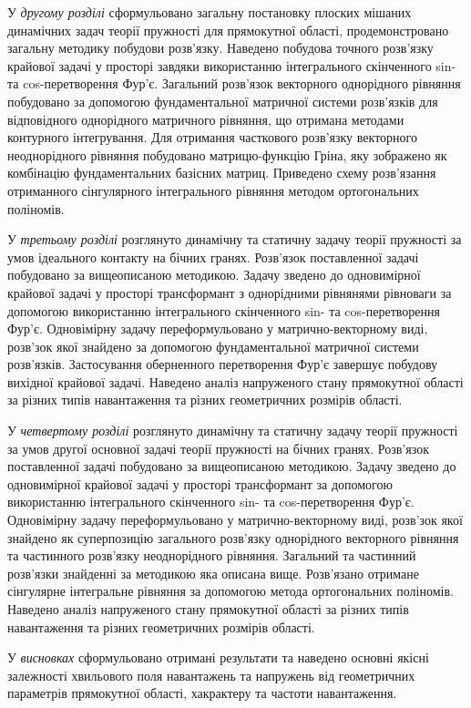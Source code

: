 У \textit{другому розділі} сформульовано загальну постановку плоских мішаних динамічних задач теорії пружності для прямокутної області,
продемонстровано загальну методику побудови розв'язку.
Наведено побудова точного розв’язку крайової задачі у просторі завдяки використанню інтегрального скінченного sin- та cos-перетворення Фур'є.
Загальний розв’язок векторного однорідного рівняння побудовано за допомогою фундаментальної матричної системи розв’язків для відповідного однорідного матричного рівняння, що отримана методами контурного інтегрування.
Для отримання часткового розв’язку векторного неоднорідного рівняння побудовано матрицю-функцію Гріна, яку зображено як комбінацію фундаментальних базісних матриц.
Приведено схему розв’язання отриманного сінгулярного інтегрального рівняння методом ортогональних поліномів.

У \textit{третьому розділі} розглянуто динамічну та статичну задачу теорії пружності за умов ідеального контакту на бічних гранях.
Розв'язок поставленної задачі побудовано за вищеописаною методикою.
Задачу зведено до одновимірної крайової задачі у просторі трансформант з однорідними рівнянями рівноваги за допомогою використанню інтегрального скінченного sin- та cos-перетворення Фур'є.
Одновімірну задачу переформульовано у матрично-векторному виді, розв'зок якої знайдено за допомогою фундаментальної матричної системи розв’язків.
Застосування оберненного перетворення Фур'є завершує побудову вихідної крайової задачі.
Наведено аналіз напруженого стану прямокутної області за різних типів навантаження та різних геометричних розмірів області.

У \textit{четвертому розділі} розглянуто динамічну та статичну задачу теорії пружності за умов другої основної задачі теорії пружності на бічних гранях.
Розв'язок поставленної задачі побудовано за вищеописаною методикою.
Задачу зведено до одновимірної крайової задачі у просторі трансформант за допомогою використанню інтегрального скінченного sin- та cos-перетворення Фур'є.
Одновімірну задачу переформульовано у матрично-векторному виді, розв'зок якої знайдено як суперпозицію загального розв'язку однорідного векторного рівняння та частинного розв'язку неоднорідного рівняння.
Загальний та частинний розв'язки знайденні за методикою яка описана вище.
Розв'язано отримане сінгулярне інтегральне рівняння за допомогою метода ортогональних поліномів.
Наведено аналіз напруженого стану прямокутної області за різних типів навантаження та різних геометричних розмірів області.

У \textit{висновках}
сформульовано отримані результати та наведено основні якісні залежності хвильового поля навантажень та напружень
від геометричних параметрів прямокутної області, хакрактеру та частоти навантаження.

